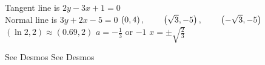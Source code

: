 \begin{Answer}[ref={exMinMax}]
\Question %
Tangent line is $2 y -3 x +1 =0$ \\\relax Normal line is $3 y +2 x -5 =0$ 
\Question %
$\left (0 ,4\right ) ,\text{\quad \quad }\left (\sqrt{3} , -5\right ) ,\text{\quad \quad }\left ( -\sqrt{3} , -5\right )$
\Question %
$\left (\ln  2 ,2\right ) \approx \left (0.69 ,2\right )$
\Question %
$a = -\frac{1}{3}$ or $ -1$
\Question %
$x = \pm \sqrt{\frac{2}{3}}$ 

\Question %
See Desmos
\Question %
See Desmos	
\end{Answer}%

